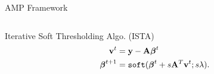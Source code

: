 \documentclass[aspectratio=43, 10pt]{beamer}
\begin{document}
\begin{frame}{AMP Framework}
\begin{columns}
        \begin{column}{0.45\textwidth}
            \vspace{-13mm}
            \begin{block}{Iterative Soft Thresholding Algo. (ISTA)}
                \vspace{-5mm}
                \begin{align}
                    \bold{v}^{t} &= \bold{y} - \bold{A} \boldsymbol{\beta}^t \notag \\ 
                    \boldsymbol{\beta}^{t+1} &= \texttt{soft}(\boldsymbol{\beta}^{t}+s\bold{A}^T \bold{v}^{t}; s\lambda). \notag 
                \end{align}
            \end{block} 
            
        \end{column}
    \end{columns}
\end{frame}
\end{document}
